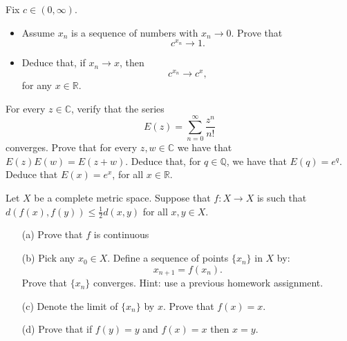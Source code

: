   \begin{exercise}
    Fix $c \in (0, \infty)$.
    \begin{itemize}
      \item Assume $x_n$ is a sequence of numbers with $x_n \to 0$. Prove that
        \begin{equation}
          c^{x_n} \to 1.
        \end{equation}
      
      \item Deduce that, if $x_n \to x$, then
        \begin{equation}
          c^{x_n} \to c^x,
        \end{equation}
        for any $x \in \mathbb{R}$.
    \end{itemize}
  \end{exercise}
  \begin{solution}

  \end{solution}

  \begin{exercise}
    For every $z \in \mathbb{C}$, verify that the series
    \begin{equation}
      E(z) = \sum_{n=0}^{\infty} \frac{z^n}{n!}
    \end{equation}
    converges. Prove that for every $z, w \in \mathbb{C}$ we have that $E(z)E(w) = E(z + w)$. Deduce that, for $q \in \mathbb{Q}$, we have that $E(q) = e^q$. Deduce that $E(x) = e^x$, for all $x \in \mathbb{R}$.
  \end{exercise}
  \begin{solution}

  \end{solution}

  \begin{exercise}
    Let $X$ be a complete metric space. Suppose that $f : X \to X$ is such that $d(f(x), f(y)) \leq \frac{1}{2}d(x, y)$ for all $x, y \in X$.
    \begin{enumerate}
      \item[(a)] Prove that $f$ is continuous
      
      \item[(b)] Pick any $x_0 \in X$. Define a sequence of points $\{x_n\}$ in $X$ by:
        \begin{equation}
          x_{n+1} = f(x_n).
        \end{equation}
        Prove that $\{x_n\}$ converges. Hint: use a previous homework assignment.
      
      \item[(c)] Denote the limit of $\{x_n\}$ by $x$. Prove that $f(x) = x$.
      
      \item[(d)] Prove that if $f(y) = y$ and $f(x) = x$ then $x = y$.
    \end{enumerate}
  \end{exercise}
  \begin{solution}

  \end{solution}

